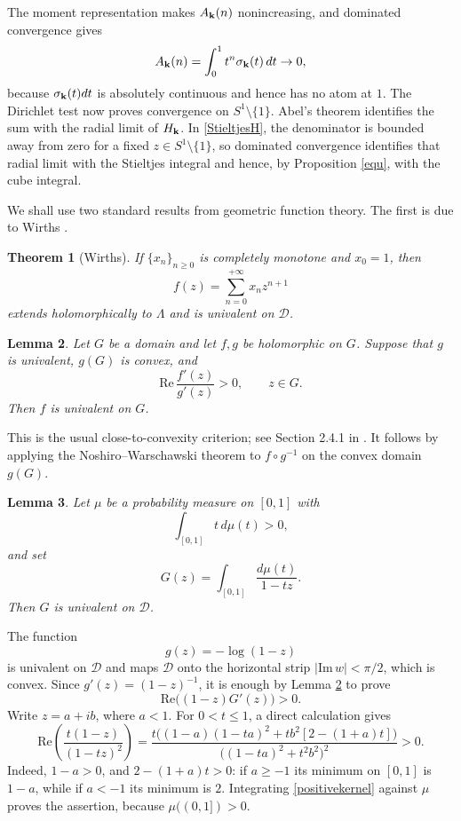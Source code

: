 \documentclass[12pt,a4paper]{amsart}
\makeatletter
\numberwithin{equation}{section}
\renewenvironment{proof}[1][Proof]{%
  \par\pushQED{\qed}%
  \normalfont\topsep6\p@\@plus6\p@\relax
  \trivlist
  \item[\hskip\labelsep\bfseries #1:]\ignorespaces
}{%
  \popQED\endtrivlist\@endpefalse
}
\theoremstyle{plain}
\newtheorem{Thm}{Theorem}[section]
\newtheorem{lem}[Thm]{Lemma}
\theoremstyle{definition}
\makeatother
\begin{document}
\begin{proof}
The moment representation makes $A_{\bf k}(n)$ nonincreasing, and dominated convergence gives
\[
A_{\bf k}(n)=\int_0^1t^n\sigma_{\bf k}(t)\,dt\rightarrow0,
\]
because $\sigma_{\bf k}(t)dt$ is absolutely continuous and hence has no atom at $1$.  The Dirichlet test now proves convergence on $S^1\setminus\{1\}$.  Abel's theorem identifies the sum with the radial limit of $H_{\bf k}$.  In \eqref{StieltjesH}, the denominator is bounded away from zero for a fixed $z\in S^1\setminus\{1\}$, so dominated convergence identifies that radial limit with the Stieltjes integral and hence, by Proposition \ref{equ}, with the cube integral.
\end{proof}

We shall use two standard results from geometric function theory.  The first is due to Wirths \cite{wir}.

\begin{Thm}[Wirths]\label{wirth}
If $\{x_n\}_{n\geq 0}$ is completely monotone and $x_0=1$, then
\[
f(z)=\sum_{n=0}^{+\infty}x_nz^{n+1}
\]
extends holomorphically to $\Lambda$ and is univalent on $\mathcal{D}$.
\end{Thm}

\begin{lem}\label{closeconvex}
Let $G$ be a domain and let $f,g$ be holomorphic on $G$.  Suppose that $g$ is univalent, $g(G)$ is convex, and
\[
\mathrm{Re}\,\frac{f'(z)}{g'(z)}>0,
\qquad z\in G.
\]
Then $f$ is univalent on $G$.
\end{lem}

This is the usual close-to-convexity criterion; see Section 2.4.1 in  \cite{GK}.  It follows by applying the Noshiro--Warschawski theorem to $f\circ g^{-1}$ on the convex domain $g(G)$.

\begin{lem}\label{shiftedunivalent}
Let $\mu$ be a probability measure on $[0,1]$ with
\[
\int_{[0,1]}t\,d\mu(t)>0,
\]
and set
\[
G(z)=\int_{[0,1]}\frac{d\mu(t)}{1-tz}.
\]
Then $G$ is univalent on $\mathcal{D}$.
\end{lem}

\begin{proof}
The function
\[
g(z)=-\log(1-z)
\]
is univalent on $\mathcal{D}$ and maps $\mathcal{D}$ onto the horizontal strip $|\mathrm{Im}\,w|<\pi/2$, which is convex.  Since $g'(z)=(1-z)^{-1}$, it is enough by Lemma \ref{closeconvex} to prove
\[
\mathrm{Re}\big((1-z)G'(z)\big)>0.
\]
Write $z=a+ib$, where $a<1$.  For $0<t\leq 1$, a direct calculation gives
\begin{equation}\label{positivekernel}
\mathrm{Re}\left(\frac{t(1-z)}{(1-tz)^2}\right)
=
\frac{t\big((1-a)(1-ta)^2+t b^2[2-(1+a)t]\big)}
{\big((1-ta)^2+t^2b^2\big)^2}>0.
\end{equation}
Indeed, $1-a>0$, and $2-(1+a)t>0$: if $a\geq-1$ its minimum on $[0,1]$ is $1-a$, while if $a<-1$ its minimum is $2$.  Integrating \eqref{positivekernel} against $\mu$ proves the assertion, because $\mu((0,1])>0$.
\end{proof}
\end{document}
